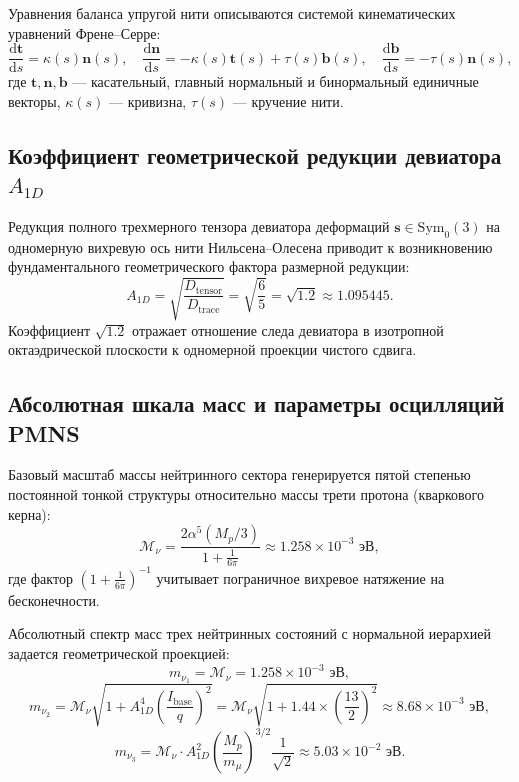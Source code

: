 \documentclass[12pt,a4paper]{article}
\theoremstyle{definition}
\theoremstyle{remark}
\begin{document}
Уравнения баланса упругой нити описываются системой кинематических уравнений Френе--Серре:
\begin{equation}
	\frac{\mathrm{d}\mathbf{t}}{\mathrm{d}s} = \kappa(s) \mathbf{n}(s), \quad \frac{\mathrm{d}\mathbf{n}}{\mathrm{d}s} = -\kappa(s)\mathbf{t}(s) + \tau(s)\mathbf{b}(s), \quad \frac{\mathrm{d}\mathbf{b}}{\mathrm{d}s} = -\tau(s)\mathbf{n}(s),
	\label{eq:frenet_serret}
\end{equation}
где $\mathbf{t}, \mathbf{n}, \mathbf{b}$ --- касательный, главный нормальный и бинормальный единичные векторы, $\kappa(s)$ --- кривизна, $\tau(s)$ --- кручение нити.

\subsection{Коэффициент геометрической редукции девиатора $A_{1D}$}
Редукция полного трехмерного тензора девиатора деформаций $\mathbf{s} \in \mathrm{Sym}_0(3)$ на одномерную вихревую ось нити Нильсена--Олесена приводит к возникновению фундаментального геометрического фактора размерной редукции:
\begin{equation}
	A_{1D} = \sqrt{\frac{D_{\mathrm{tensor}}}{D_{\mathrm{trace}}}} = \sqrt{\frac{6}{5}} = \sqrt{1.2} \approx 1.095445.
	\label{eq:a1d_factor}
\end{equation}
Коэффициент $\sqrt{1.2}$ отражает отношение следа девиатора в изотропной октаэдрической плоскости к одномерной проекции чистого сдвига.

\subsection{Абсолютная шкала масс и параметры осцилляций PMNS}
Базовый масштаб массы нейтринного сектора генерируется пятой степенью постоянной тонкой структуры относительно массы трети протона (кваркового керна):
\begin{equation}
	\mathcal{M}_\nu = \frac{2\alpha^5 (M_p / 3)}{1 + \frac{1}{6\pi}} \approx 1.258 \times 10^{-3} \text{ эВ},
	\label{eq:neutrino_mass_scale}
\end{equation}
где фактор $(1 + \frac{1}{6\pi})^{-1}$ учитывает пограничное вихревое натяжение на бесконечности.

Абсолютный спектр масс трех нейтринных состояний с нормальной иерархией задается геометрической проекцией:
\begin{equation}
	m_{\nu_1} = \mathcal{M}_\nu = 1.258 \times 10^{-3} \text{ эВ},
	\label{eq:mnu1}
\end{equation}
\begin{equation}
	m_{\nu_2} = \mathcal{M}_\nu \sqrt{1 + A_{1D}^4 \left(\frac{I_{\mathrm{base}}}{q}\right)^2} = \mathcal{M}_\nu \sqrt{1 + 1.44 \times \left(\frac{13}{2}\right)^2} \approx 8.68 \times 10^{-3} \text{ эВ},
	\label{eq:mnu2}
\end{equation}
\begin{equation}
	m_{\nu_3} = \mathcal{M}_\nu \cdot A_{1D}^2 \left( \frac{M_p}{m_\mu} \right)^{3/2} \frac{1}{\sqrt{2}} \approx 5.03 \times 10^{-2} \text{ эВ}.
	\label{eq:mnu3}
\end{equation}
\end{document}
